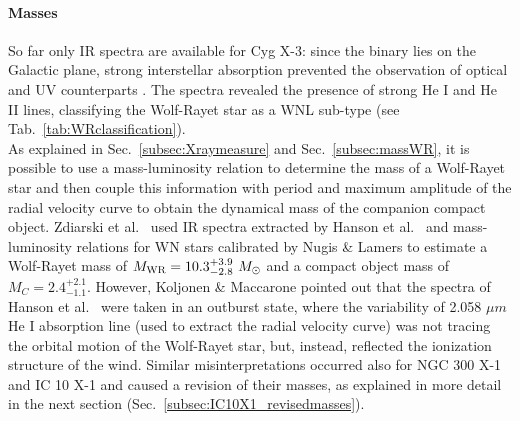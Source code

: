 \documentclass[a4paper,titlepage]{book}     	%
\newcommand{\sun}{\ensuremath{_\odot}}
\newcommand{\msun}{\ensuremath{M\sun}}
\newcommand{\mwr}{\ensuremath{M_\textup{WR}}}
\begin{document}
\paragraph{Masses} So far only IR spectra are available for Cyg X-3: since the binary lies on the Galactic plane, strong interstellar absorption prevented the observation of optical and UV counterparts \cite{CygX-3_Koljonen2017}. The spectra revealed the presence of strong He I and He II lines, classifying the Wolf-Rayet star as a WNL sub-type (see Tab.\ \ref{tab:WRclassification}).\\

As explained in Sec.\ \ref{subsec:Xraymeasure} and Sec.\ \ref{subsec:massWR}, it is possible to use a mass-luminosity relation to determine the mass of a Wolf-Rayet star and then couple this information with period and maximum amplitude of the radial velocity curve to obtain the dynamical mass of the companion compact object. Zdiarski et al.\ \cite{Cyg-X3_Zd2013} used IR spectra extracted by Hanson et al.\ \cite{CygX-3_Hanson2000wrongspectrum} and mass-luminosity relations for WN stars calibrated by Nugis \& Lamers \cite{Nugis2000_WRwinds} to estimate a Wolf-Rayet mass of $\mwr = 10.3_{-2.8}^{+3.9}~\msun$ and a compact object mass of $M_C = 2.4_{-1.1}^{+2.1}$. However, Koljonen \& Maccarone \cite{CygX-3_Koljonen2017} pointed out that the spectra of Hanson et al.\ \cite{CygX-3_Hanson2000wrongspectrum} were taken in an outburst state, where the variability of 2.058 $\mu m$ He I absorption line (used to extract the radial velocity curve) was not tracing the orbital motion of the Wolf-Rayet star, but, instead, reflected the ionization structure of the wind. Similar misinterpretations occurred also for NGC 300 X-1 and IC 10 X-1 and caused a revision of their masses, as explained in more detail in the next section (Sec.\ \ref{subsec:IC10X1_revisedmasses}). \\
\end{document}
